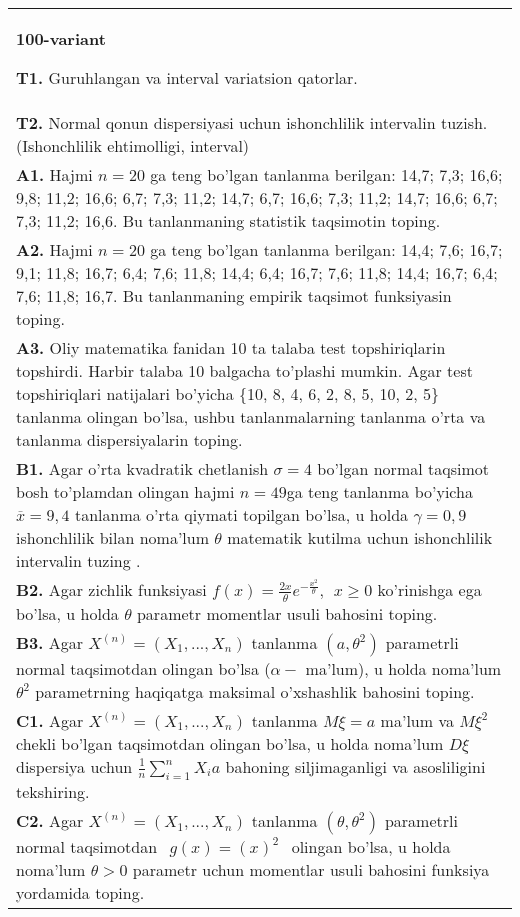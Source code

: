 \documentclass{article}
\begin{document}
\begin{tabular}{m{17cm}}
\textbf{100-variant}
\newline

\textbf{T1.} 
Guruhlangan va interval variatsion qatorlar.
\\
\textbf{T2.} 
Normal qonun dispersiyasi uchun ishonchlilik intervalin tuzish. (Ishonchlilik ehtimolligi, interval)
\\
\textbf{A1.} 
Hajmi \(n = 20\) ga teng bo'lgan tanlanma berilgan: 14,7; 7,3; 16,6; 9,8; 11,2; 16,6; 6,7; 7,3; 11,2; 14,7; 6,7; 16,6; 7,3; 11,2; 14,7; 16,6; 6,7; 7,3; 11,2; 16,6. Bu tanlanmaning statistik taqsimotin toping.
\\
\textbf{A2.} 
Hajmi \(n = 20\) ga teng bo'lgan tanlanma berilgan: 14,4; 7,6; 16,7; 9,1; 11,8; 16,7; 6,4; 7,6; 11,8; 14,4; 6,4; 16,7; 7,6; 11,8; 14,4; 16,7; 6,4; 7,6; 11,8; 16,7. Bu tanlanmaning empirik taqsimot funksiyasin toping.
\\
\textbf{A3.} 
Oliy matematika fanidan 10 ta talaba test topshiriqlarin topshirdi. Harbir talaba 10 balgacha to'plashi mumkin. Agar test topshiriqlari natijalari bo'yicha \{10, 8, 4, 6, 2, 8, 5, 10, 2, 5\} tanlanma olingan bo'lsa, ushbu tanlanmalarning tanlanma o'rta va tanlanma dispersiyalarin toping.
\\
\textbf{B1.} 
Agar o'rta kvadratik chetlanish \(\sigma = 4\) bo'lgan normal taqsimot bosh to'plamdan olingan hajmi \(n = 49\)ga teng tanlanma bo'yicha \(\overline{x} = 9,4\) tanlanma o'rta qiymati topilgan bo'lsa, u holda \(\gamma = 0,9\) ishonchlilik bilan noma'lum \(\theta\) matematik kutilma uchun ishonchlilik intervalin tuzing .
\\
\textbf{B2.} 
Agar zichlik funksiyasi \(f(x) = \frac{2x}{\theta}e^{- \frac{x^{2}}{\theta}},\ \ x \geq 0\) ko'rinishga ega bo'lsa, u holda \(\theta\) parametr momentlar usuli bahosini toping.
\\
\textbf{B3.} 
Agar \(X^{(n)} = \left( X_{1},...,X_{n} \right)\) tanlanma \(\left( a,\theta^{2} \right)\) parametrli normal taqsimotdan olingan bo'lsa (\(\alpha -\) ma'lum), u holda noma'lum \(\theta^{2}\) parametrning haqiqatga maksimal o'xshashlik bahosini toping.
\\
\textbf{C1.} 
Agar \(X^{(n)} = \left( X_{1},...,X_{n} \right)\) tanlanma \(M\xi = a\) ma'lum va \(M\xi^{2}\) chekli bo'lgan taqsimotdan olingan bo'lsa, u holda noma'lum \(D\xi\) dispersiya uchun \(\frac{1}{n}\sum_{i = 1}^{n}{X_{i}a}\) bahoning siljimaganligi va asosliligini tekshiring.
\\
\textbf{C2.} 
Agar \(X^{(n)} = \left( X_{1},...,X_{n} \right)\) tanlanma \((\theta,\theta^{2})\) parametrli normal taqsimotdan \(\ \ g(x) = (x)^{2}\ \ \) olingan bo'lsa, u holda noma'lum \(\theta > 0\) parametr uchun momentlar usuli bahosini funksiya yordamida toping.

\end{tabular}
\end{document}
